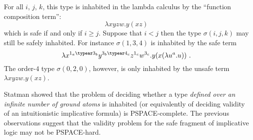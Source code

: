 For all $i$, $j$, $k$, this type is inhabited in the lambda calculus
by the ``function composition term'':
$$\lambda x y z w . y (x z) $$
which is safe if and only if $i\geq j$. Suppose that $i<j$ then the type
$\sigma(i,j,k)$ may still be safely inhabited. For instance
$\sigma(1,3,4)$ is inhabited by the safe term
$$ \lambda x^{1_a \typear 3_b} y^{3_b \typear 4_c} z^{1_c} w^{3_c} . y (x (\lambda u^a . u)) \ .$$
The order-$4$ type $\sigma(0,2,0)$, however, is only inhabited by the unsafe term $\lambda x y z w. y (x z) $.


Statman showed \cite{Statman1979} that the problem of deciding
whether a type \emph{defined over an infinite number of ground
atoms} is inhabited (or equivalently of deciding validity of an
intuitionistic implicative formula) is PSPACE-complete. The previous
observations suggest that the validity problem for the safe fragment
of implicative logic may not be PSPACE-hard.
